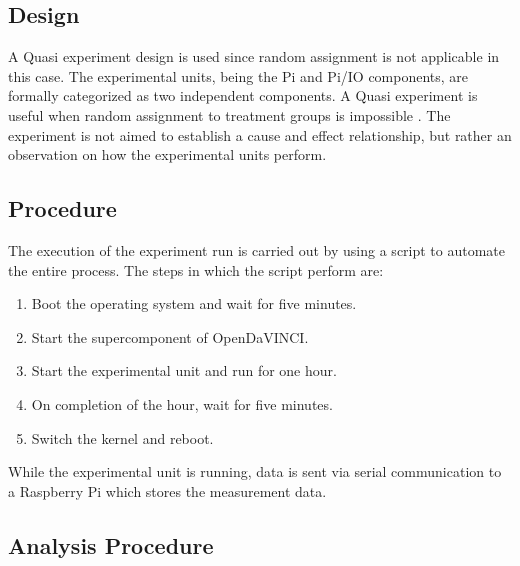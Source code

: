 \subsection{Design}
A Quasi experiment design is used since random assignment is not applicable in this case. The experimental units, being the Pi and Pi/IO components, are
formally categorized as two independent components. A Quasi experiment is useful when random assignment to treatment groups is impossible \cite{juristo2003lecture}. The experiment is not aimed to establish a cause and effect relationship, but rather an observation on how the experimental units perform.
\subsection{Procedure}

The execution of the experiment run is carried out by using a script to automate the entire process. The steps in which the script perform are:\\

\begin{enumerate}  
\item Boot the operating system and wait for five minutes.  
\item Start the supercomponent of OpenDaVINCI.
\item Start the experimental unit and run for one hour.
\item On completion of the hour, wait for five minutes.
\item Switch the kernel and reboot.\\ 
\end{enumerate}

While the experimental unit is running, data is sent via serial communication to a Raspberry Pi which stores the measurement data. 


\subsection{Analysis Procedure}















